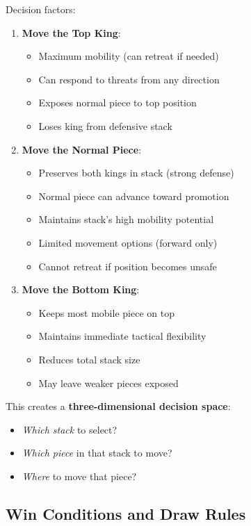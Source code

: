 \documentclass[12pt,a4paper]{article}
\begin{document}
Decision factors:
\begin{enumerate}
    \item \textbf{Move the Top King}:
    \begin{itemize}
        \item[$+$] Maximum mobility (can retreat if needed)
        \item[$+$] Can respond to threats from any direction
        \item[$-$] Exposes normal piece to top position
        \item[$-$] Loses king from defensive stack
    \end{itemize}
    
    \item \textbf{Move the Normal Piece}:
    \begin{itemize}
        \item[$+$] Preserves both kings in stack (strong defense)
        \item[$+$] Normal piece can advance toward promotion
        \item[$+$] Maintains stack's high mobility potential
        \item[$-$] Limited movement options (forward only)
        \item[$-$] Cannot retreat if position becomes unsafe
    \end{itemize}
    
    \item \textbf{Move the Bottom King}:
    \begin{itemize}
        \item[$+$] Keeps most mobile piece on top
        \item[$+$] Maintains immediate tactical flexibility
        \item[$-$] Reduces total stack size
        \item[$-$] May leave weaker pieces exposed
    \end{itemize}
\end{enumerate}

This creates a \textbf{three-dimensional decision space}:
\begin{itemize}
    \item \textit{Which stack} to select?
    \item \textit{Which piece} in that stack to move?
    \item \textit{Where} to move that piece?
\end{itemize}

\subsection{Win Conditions and Draw Rules}
\end{document}
